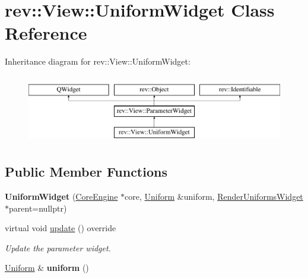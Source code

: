 \hypertarget{classrev_1_1_view_1_1_uniform_widget}{}\section{rev\+::View\+::Uniform\+Widget Class Reference}
\label{classrev_1_1_view_1_1_uniform_widget}
Inheritance diagram for rev\+::View\+::Uniform\+Widget\+:\begin{figure}[H]
\begin{center}
\leavevmode
\includegraphics[height=3.000000cm]{classrev_1_1_view_1_1_uniform_widget}
\end{center}
\end{figure}
\subsection*{Public Member Functions}
\begin{DoxyCompactItemize}
\item 
\mbox{\label{classrev_1_1_view_1_1_uniform_widget_af4d3ca53b2f0c1e7d935d88133cdee0f}} 
{\bfseries Uniform\+Widget} (\mbox{\hyperlink{classrev_1_1_core_engine}{Core\+Engine}} $\ast$core, \mbox{\hyperlink{structrev_1_1_uniform}{Uniform}} \&uniform, \mbox{\hyperlink{classrev_1_1_view_1_1_render_uniforms_widget}{Render\+Uniforms\+Widget}} $\ast$parent=nullptr)
\item 
\mbox{\label{classrev_1_1_view_1_1_uniform_widget_adc8c4bc4aa00293fd6a4cd6d7de10d11}} 
virtual void \mbox{\hyperlink{classrev_1_1_view_1_1_uniform_widget_adc8c4bc4aa00293fd6a4cd6d7de10d11}{update}} () override
\begin{DoxyCompactList}\small\item\em Update the parameter widget. \end{DoxyCompactList}\item 
\mbox{\label{classrev_1_1_view_1_1_uniform_widget_a0e23c488ea0599a40c5b86773d4660d9}} 
\mbox{\hyperlink{structrev_1_1_uniform}{Uniform}} \& {\bfseries uniform} ()
\end{DoxyCompactItemize}
